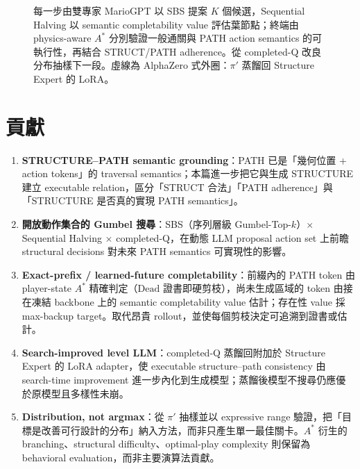\documentclass[11pt,a4paper]{article}
\begin{document}
\begin{figure}[H]
{}
\caption{每一步由雙專家 MarioGPT 以 SBS 提案 $K$ 個候選，Sequential Halving 以 semantic completability value 評估葉節點；終端由 physics-aware $A^*$ 分別驗證一般通關與 PATH action semantics 的可執行性，再結合 STRUCT/PATH adherence。從 completed-Q 改良分布抽樣下一段。虛線為 AlphaZero 式外圈：$\pi'$ 蒸餾回 Structure Expert 的 LoRA。}
\end{figure}

\section{貢獻}
\begin{enumerate}
\item \textbf{STRUCTURE--PATH semantic grounding}：PATH 已是「幾何位置 + action tokens」的 traversal semantics；本篇進一步把它與生成 STRUCTURE 建立 executable relation，區分「STRUCT 合法」「PATH adherence」與「STRUCTURE 是否真的實現 PATH semantics」。
\item \textbf{開放動作集合的 Gumbel 搜尋}：SBS（序列層級 Gumbel-Top-$k$）$\times$ Sequential Halving $\times$ completed-Q，在動態 LLM proposal action set 上前瞻 structural decisions 對未來 PATH semantics 可實現性的影響。
\item \textbf{Exact-prefix / learned-future completability}：前綴內的 PATH token 由 player-state $A^*$ 精確判定（$\mathrm{Dead}$ 證書即硬剪枝），尚未生成區域的 token 由接在凍結 backbone 上的 semantic completability value 估計；存在性 value 採 max-backup target。取代昂貴 rollout，並使每個剪枝決定可追溯到證書或估計。
\item \textbf{Search-improved level LLM}：completed-Q 蒸餾回附加於 Structure Expert 的 LoRA adapter，使 executable structure--path consistency 由 search-time improvement 進一步內化到生成模型；蒸餾後模型不搜尋仍應優於原模型且多樣性未崩。
\item \textbf{Distribution, not argmax}：從 $\pi'$ 抽樣並以 expressive range 驗證，把「目標是改善可行設計的分布」納入方法，而非只產生單一最佳關卡。$A^*$ 衍生的 branching、structural difficulty、optimal-play complexity 則保留為 behavioral evaluation，而非主要演算法貢獻。
\end{enumerate}
\end{document}
